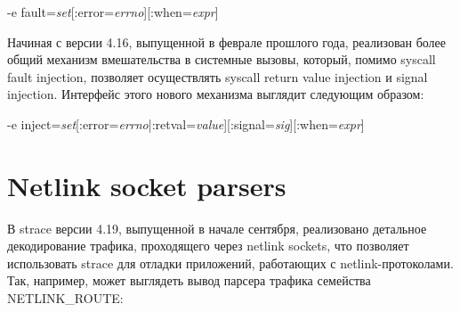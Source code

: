 -e fault=\textit{set}[:error=\textit{errno}][:when=\textit{expr}]

Начиная с версии 4.16, выпущенной в феврале прошлого года, реализован более
общий механизм вмешательства в системные вызовы, который, помимо syscall fault
injection, позволяет осуществлять syscall return value injection и signal
injection.  Интерфейс этого нового механизма выглядит следующим образом:

-e inject=\textit{set}[:error=\textit{errno}|:retval=\textit{value}][:signal=\textit{sig}][:when=\textit{expr}]

\section{Netlink socket parsers}
В strace версии 4.19, выпущенной в начале сентября, реализовано детальное
декодирование трафика, проходящего через netlink sockets, что позволяет
использовать strace для отладки приложений, работающих с netlink-протоколами.
Так, например, может выглядеть вывод парсера трафика семейства NETLINK\_ROUTE:

